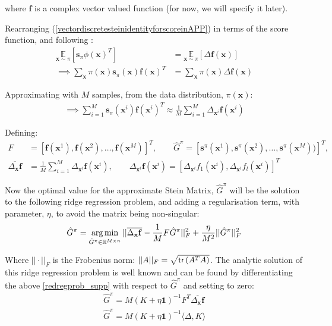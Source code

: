 \noindent where $\mathbf{f}$ is a complex vector valued function (for now, we will specify it later).

Rearranging (\ref{vectordiscretesteinidentityforscoreinAPP}) in terms of the score function, and following :
\begin{align}
    \underset{\mathbf{x}\sim \pi}{\mathbb{E}}[\mathbf{s}_\pi\phi(\mathbf{x})^T] &= \underset{\mathbf{x}\sim \pi}{\mathbb{E}} [\Delta \mathbf{f}(\mathbf{x})] \\
    \implies \sum\limits_{\mathbf{x}}\pi(\mathbf{x})\mathbf{s}_\pi(\mathbf{x})\mathbf{f}(\mathbf{x})^T &= \sum\limits_{\mathbf{x}}\pi(\mathbf{x})\Delta \mathbf{f}(\mathbf{x})
\end{align}


\noindent Approximating with $M$ samples, from the data distribution, $\pi(\mathbf{x})$:
\begin{align}
 \implies \sum\limits_{i=1}^{M}\mathbf{s}_\pi(\mathbf{x}^i)\mathbf{f}(\mathbf{x}^i)^T \approx \frac{1}{M}\sum\limits_{i=1}^{M}\Delta_{\mathbf{x}^i} \mathbf{f}(\mathbf{x}^i)
\end{align}

\noindent Defining:
\begin{align}
   F &= [\mathbf{f}(\mathbf{x}^1), \mathbf{f}(\mathbf{x}^2), \dots, \mathbf{f}(\mathbf{x}^M)]^T,\qquad
   \hat{G}^\pi = [\mathbf{s}^\pi(\mathbf{x}^1), \mathbf{s}^\pi(\mathbf{x}^2), \dots, \mathbf{s}^\pi(\mathbf{x}^M))]^T,\\
\overline{\Delta_{\mathbf{x}}\mathbf{f}} &= \frac{1}{M}\sum_{i=1}^M \Delta_{\mathbf{x}^i}\mathbf{f}(\mathbf{x}^i), \qquad \Delta_{\mathbf{x}^i}\mathbf{f}(\mathbf{x}^i) =  [\Delta_{\mathbf{x}^i}f_1(\mathbf{x}^i),\Delta_{\mathbf{x}^i}f_l(\mathbf{x}^i)]^T
\end{align}

\noindent Now the optimal value for the approximate Stein Matrix, $\hat{G}^\pi$ will be the solution to the following ridge regression problem, and adding a regularisation term, with parameter, $\eta$, to avoid the matrix being non-singular:
\begin{align}
    \hat{G}^{\pi} = \operatorname*{arg\,min}_{\hat{G}^{\pi} \in \mathbb{R}^{M\times n}}||\overline{\Delta_{\mathbf{x}}\mathbf{f}} - \frac{1}{M}F\hat{G}^{\pi}||_F^2 + \frac{\eta}{M^2}||\hat{G}^{\pi}||_F^2 \label{redregprob_supp}
\end{align}


\noindent Where $||\cdot||_F$ is the Frobenius norm: $||A||_F = \sqrt{\textsf{tr}\left(A^TA\right)}$.
The analytic solution of this ridge regression problem is well known and can be found by differentiating the above \eqref{redregprob_supp} with respect to $\hat{G}^{\pi}$ and setting to zero:
\begin{align}
    \hat{G}^{\pi} =  M(K+\eta\mathbf{1})^{-1}F^T\overline{\Delta_{\mathbf{x}}\mathbf{f}}\\
    \hat{G}^{\pi} =  M(K+\eta\mathbf{1})^{-1}\langle\Delta, K\rangle \label{approxscore_liderivation}
\end{align}

